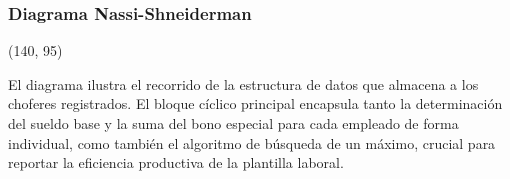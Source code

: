 \documentclass[12pt, a4paper]{article}
\begin{document}
\subsubsection{Diagrama Nassi-Shneiderman}
\vspace{0.5cm}
\begin{center}
\begin{struktogramm}(140, 95)
    \change
    \ifend
    \change
    \ifend
  \whileend
\end{struktogramm}
\end{center}

\vspace*{1.5cm}
\noindent
El diagrama ilustra el recorrido de la estructura de datos que almacena a los choferes registrados. El bloque cíclico principal encapsula tanto la determinación del sueldo base y la suma del bono especial para cada empleado de forma individual, como también el algoritmo de búsqueda de un máximo, crucial para reportar la eficiencia productiva de la plantilla laboral.
\end{document}
